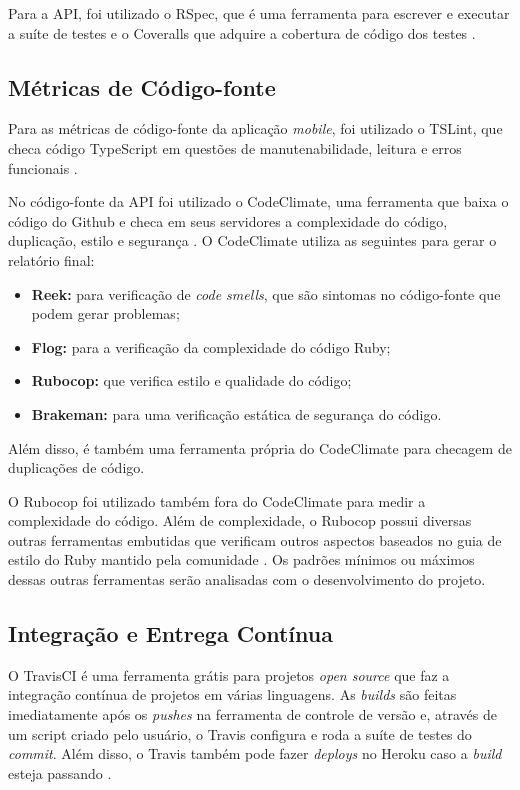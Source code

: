 Para a API, foi utilizado o RSpec, que é uma ferramenta para escrever e executar a suíte de testes \cite{rspec} e o Coveralls que adquire a cobertura de código dos testes \cite{coveralls}.

\subsection{Métricas de Código-fonte}
Para as métricas de código-fonte da aplicação \textit{mobile}, foi utilizado o TSLint, que checa código TypeScript em questões de manutenabilidade, leitura e erros funcionais \cite{tslint}.

No código-fonte da API foi utilizado o CodeClimate, uma ferramenta que baixa o código do Github e checa em seus servidores a complexidade do código, duplicação, estilo e segurança \cite{codeclimate}. O CodeClimate utiliza as seguintes para gerar o relatório final:
\begin{itemize}
    \item \textbf{Reek:} para verificação de \textit{code smells}, que são sintomas no código-fonte que podem gerar problemas;
    \item \textbf{Flog:} para a verificação da complexidade do código Ruby;
    \item \textbf{Rubocop:} que verifica estilo e qualidade do código;
    \item \textbf{Brakeman:} para uma verificação estática de segurança do código.
\end{itemize}

Além disso, é também uma ferramenta própria do CodeClimate para checagem de duplicações de código.

O Rubocop foi utilizado também fora do CodeClimate para medir a complexidade do código. Além de complexidade, o Rubocop possui diversas outras ferramentas embutidas que verificam outros aspectos baseados no guia de estilo do Ruby mantido pela comunidade \cite{rubocop}. Os padrões mínimos ou máximos dessas outras ferramentas serão analisadas com o desenvolvimento do projeto.

\subsection{Integração e Entrega Contínua}

O TravisCI é uma ferramenta grátis para projetos \textit{open source} que faz a integração contínua de projetos em várias linguagens. As \textit{builds} são feitas imediatamente após os \textit{pushes} na ferramenta de controle de versão e, através de um script criado pelo usuário, o Travis configura e roda a suíte de testes do \textit{commit}. Além disso, o Travis também pode fazer \textit{deploys} no Heroku caso a \textit{build} esteja passando \cite{travis-ci}.


